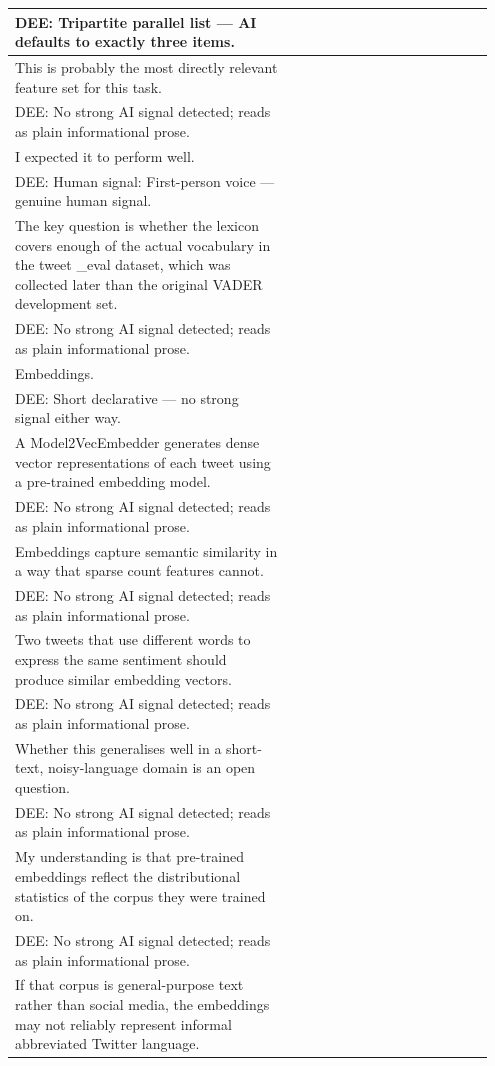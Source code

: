 \documentclass[11pt]{article}
\begin{document}
\begin{longtable}{|p{0.55\linewidth}|p{0.40\linewidth}|}
\hline
DEE: Tripartite parallel list --- AI defaults to exactly three items. & \\
\hline
This is probably the most directly relevant feature set for this task. & \\[2pt]
\hline
DEE: No strong AI signal detected; reads as plain informational prose. & \\
\hline
I expected it to perform well. & \\[2pt]
\hline
DEE: Human signal: First-person voice --- genuine human signal. & \\
\hline
The key question is whether the lexicon covers enough of the actual vocabulary in the tweet \_eval dataset, which was collected later than the original VADER development set. & \\[2pt]
\hline
DEE: No strong AI signal detected; reads as plain informational prose. & \\
\hline
Embeddings. & \\[2pt]
\hline
DEE: Short declarative --- no strong signal either way. & \\
\hline
A Model2VecEmbedder generates dense vector representations of each tweet using a pre-trained embedding model. & \\[2pt]
\hline
DEE: No strong AI signal detected; reads as plain informational prose. & \\
\hline
Embeddings capture semantic similarity in a way that sparse count features cannot. & \\[2pt]
\hline
DEE: No strong AI signal detected; reads as plain informational prose. & \\
\hline
Two tweets that use different words to express the same sentiment should produce similar embedding vectors. & \\[2pt]
\hline
DEE: No strong AI signal detected; reads as plain informational prose. & \\
\hline
Whether this generalises well in a short-text, noisy-language domain is an open question. & \\[2pt]
\hline
DEE: No strong AI signal detected; reads as plain informational prose. & \\
\hline
My understanding is that pre-trained embeddings reflect the distributional statistics of the corpus they were trained on. & \\[2pt]
\hline
DEE: No strong AI signal detected; reads as plain informational prose. & \\
\hline
If that corpus is general-purpose text rather than social media, the embeddings may not reliably represent informal abbreviated Twitter language. & \\[2pt]

\end{longtable}
\end{document}
